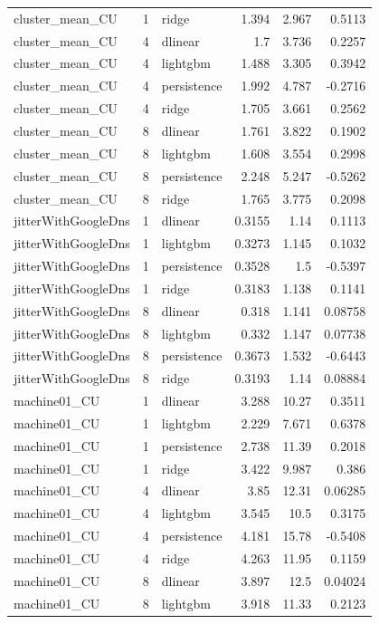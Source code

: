 \begin{table}
\begin{tabular}{lrlrrr}
cluster_mean_CU & 1 & ridge & 1.394 & 2.967 & 0.5113 \\
cluster_mean_CU & 4 & dlinear & 1.7 & 3.736 & 0.2257 \\
cluster_mean_CU & 4 & lightgbm & 1.488 & 3.305 & 0.3942 \\
cluster_mean_CU & 4 & persistence & 1.992 & 4.787 & -0.2716 \\
cluster_mean_CU & 4 & ridge & 1.705 & 3.661 & 0.2562 \\
cluster_mean_CU & 8 & dlinear & 1.761 & 3.822 & 0.1902 \\
cluster_mean_CU & 8 & lightgbm & 1.608 & 3.554 & 0.2998 \\
cluster_mean_CU & 8 & persistence & 2.248 & 5.247 & -0.5262 \\
cluster_mean_CU & 8 & ridge & 1.765 & 3.775 & 0.2098 \\
jitterWithGoogleDns & 1 & dlinear & 0.3155 & 1.14 & 0.1113 \\
jitterWithGoogleDns & 1 & lightgbm & 0.3273 & 1.145 & 0.1032 \\
jitterWithGoogleDns & 1 & persistence & 0.3528 & 1.5 & -0.5397 \\
jitterWithGoogleDns & 1 & ridge & 0.3183 & 1.138 & 0.1141 \\
jitterWithGoogleDns & 8 & dlinear & 0.318 & 1.141 & 0.08758 \\
jitterWithGoogleDns & 8 & lightgbm & 0.332 & 1.147 & 0.07738 \\
jitterWithGoogleDns & 8 & persistence & 0.3673 & 1.532 & -0.6443 \\
jitterWithGoogleDns & 8 & ridge & 0.3193 & 1.14 & 0.08884 \\
machine01_CU & 1 & dlinear & 3.288 & 10.27 & 0.3511 \\
machine01_CU & 1 & lightgbm & 2.229 & 7.671 & 0.6378 \\
machine01_CU & 1 & persistence & 2.738 & 11.39 & 0.2018 \\
machine01_CU & 1 & ridge & 3.422 & 9.987 & 0.386 \\
machine01_CU & 4 & dlinear & 3.85 & 12.31 & 0.06285 \\
machine01_CU & 4 & lightgbm & 3.545 & 10.5 & 0.3175 \\
machine01_CU & 4 & persistence & 4.181 & 15.78 & -0.5408 \\
machine01_CU & 4 & ridge & 4.263 & 11.95 & 0.1159 \\
machine01_CU & 8 & dlinear & 3.897 & 12.5 & 0.04024 \\
machine01_CU & 8 & lightgbm & 3.918 & 11.33 & 0.2123 \\

\end{tabular}
\end{table}
